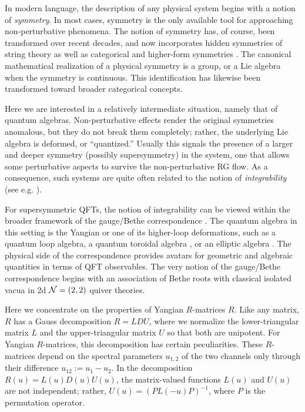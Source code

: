 \documentclass[10pt]{article}
\theoremstyle{definition}
\def\CN {{\cal N}}
\numberwithin{equation}{section}
\begin{document}
In modern language, the description of any physical system begins with a notion of \emph{symmetry}.
In most cases, symmetry is the only available tool for approaching non-perturbative phenomena.
The notion of symmetry has, of course, been transformed over recent decades, and now incorporates hidden symmetries of string theory \cite{Morozov:1992ea,Mironov:1993wi} as well as categorical and higher-form symmetries \cite{Bah:2022wot,Cordova:2022qga,Brennan:2023rmb,Luo:2024nsj,Freed:2022qja}.
The canonical mathematical realization of a physical symmetry is a group, or a Lie algebra when the symmetry is continuous.
This identification has likewise been transformed toward broader categorical concepts.

Here we are interested in a relatively intermediate situation, namely that of quantum algebras.
Non-perturbative effects render the original symmetries anomalous, but they do not break them completely; rather, the underlying Lie algebra is deformed, or ``quantized.''
Usually this signals the presence of a larger and deeper symmetry (possibly supersymmetry) in the system, one that allows some perturbative aspects to survive the non-perturbative RG flow.
As a consequence, such systems are quite often related to the notion of \emph{integrability} (see e.g. \cite{Morozov:1994hh,Mironov:1994sf,Gorsky:1995zq,Mironov:2022fsr,Yamazaki:2025gti,Bombardelli:2016prim,Komatsu:2026tdi}).

For supersymmetric QFTs, the notion of integrability can be viewed within the broader framework of the gauge/Bethe correspondence \cite{Nekrasov:2009uh,Nekrasov:2009ui}.
The quantum algebra in this setting is the Yangian \cite{Drinfeld1,Drinfeld2} or one of its higher-loop deformations, such as a quantum loop algebra, a quantum toroidal algebra \cite{Moody:1990toroidal}, or an elliptic algebra \cite{Feigin:1995elliptic}.
The physical side of the correspondence provides avatars for geometric and algebraic quantities in terms of QFT observables.
The very notion of the gauge/Bethe correspondence begins with an association of Bethe roots with classical isolated vacua in  2d $\CN=(2,2)$ quiver theories.

Here we concentrate on the properties of Yangian $R$-matrices $R$.
Like any matrix, $R$ has a Gauss decomposition $R=LDU$, where we normalize the lower-triangular matrix $L$ and the upper-triangular matrix $U$ so that both are unipotent.
For Yangian $R$-matrices, this decomposition has certain peculiarities.
These $R$-matrices depend on the spectral parameters $u_{1,2}$ of the two channels only through their difference $u_{12}:=u_1-u_2$.
In the decomposition $R(u)=L(u)D(u)U(u)$, the matrix-valued functions $L(u)$ and $U(u)$ are not independent; rather, $U(u)=\left(PL(-u)P\right)^{-1}$, where $P$ is the permutation operator.
\end{document}

